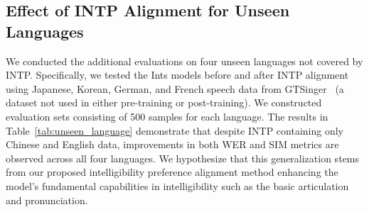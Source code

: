 \documentclass[11pt]{article}
\begin{document}
\subsection{Effect of INTP Alignment for Unseen Languages}

\begin{table}[t]
\begin{center}
\begin{threeparttable}
\end{threeparttable}
\caption{Effect of INTP alignment for unseen languages.}
\label{tab:unseen_language}
\end{center}
\end{table}

We conducted the additional evaluations on four unseen languages not covered by INTP. Specifically, we tested the Ints models before and after INTP alignment using Japanese, Korean, German, and French speech data from GTSinger~\cite{gtsinger} (a dataset not used in either pre-training or post-training). We constructed evaluation sets consisting of 500 samples for each language. The results in Table~\ref{tab:unseen_language} demonstrate that despite INTP containing only Chinese and English data, improvements in both WER and SIM metrics are observed across all four languages. We hypothesize that this generalization stems from our proposed intelligibility preference alignment method enhancing the model's fundamental capabilities in intelligibility such as the basic articulation and pronunciation.
\end{document}

